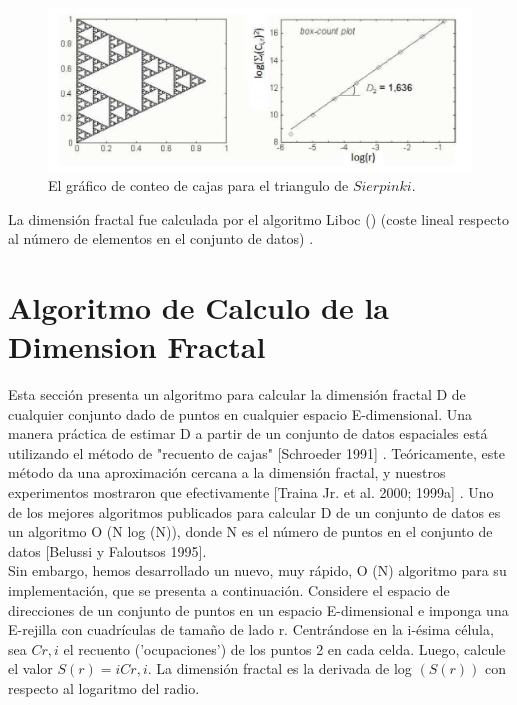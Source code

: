 \begin{figure}[h]
\centering
\includegraphics[scale=1.4]{chapter4/ima4.png}
\caption{El gráfico de conteo de cajas para el triangulo de $Sierpinki$.}
\label{fig:ima4}
\end{figure}

La dimensión fractal fue calculada por el algoritmo Liboc () (coste lineal respecto al número de elementos en el conjunto de datos)  \cite{DBLP:journals/jidm/TrainaTF10}.


\section{Algoritmo de Calculo de la Dimension Fractal}

Esta sección presenta un algoritmo para calcular la dimensión fractal D de cualquier conjunto dado de puntos en cualquier espacio E-dimensional. Una manera práctica de estimar D a partir de un conjunto de datos espaciales está utilizando el método de "recuento de cajas" [Schroeder 1991] \cite{schroeder}. Teóricamente, este método da una aproximación cercana a la dimensión fractal, y nuestros experimentos mostraron que efectivamente [Traina Jr. et al. 2000; 1999a] \cite{traina2000} \cite{traina1999}. Uno de los mejores algoritmos publicados para calcular D de un conjunto de datos es un algoritmo O (N log (N)), donde N es el número de puntos en el conjunto de datos [Belussi y Faloutsos 1995]\cite{belussi}. \\

Sin embargo, hemos desarrollado un nuevo, muy rápido, O (N) algoritmo para su implementación, que se presenta a continuación. Considere el espacio de direcciones de un conjunto de puntos en un espacio E-dimensional e imponga una E-rejilla con cuadrículas de tamaño de lado r. Centrándose en la i-ésima célula, sea $C r, i$ el recuento ('ocupaciones') de los puntos 2 en cada celda. Luego, calcule el valor $S (r) = i C r, i$. La dimensión fractal es la derivada de log $(S (r))$ con respecto al logaritmo del radio. \\

